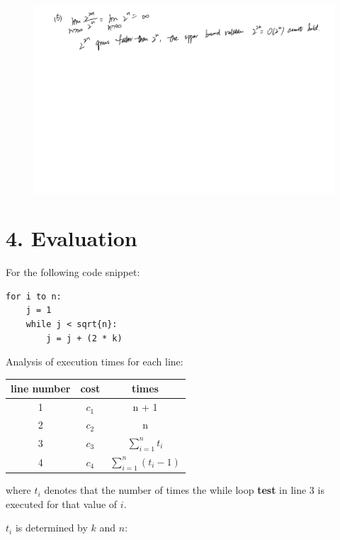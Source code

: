 \documentclass[10pt]{article}
\begin{document}
\begin{figure}[H]
  \centering
  \includegraphics[width=\linewidth]{../assets/3_4.jpg}
\end{figure}

\section*{4. Evaluation}

For the following code snippet:

\begin{lstlisting}
for i to n:
    j = 1
    while j < sqrt{n}:
        j = j + (2 * k)
\end{lstlisting}

Analysis of execution times for each line:

\begin{center}
  \begin{tabular}{||c c c||}
    \hline
    line number & cost  & times                    \\
    \hline
    1           & $c_1$ & n + 1                    \\
    \hline
    2           & $c_2$ & n                        \\
    \hline
    3           & $c_3$ & $\sum_{i=1}^n t_i$       \\
    \hline
    4           & $c_4$ & $\sum_{i=1}^n (t_i - 1)$ \\
    \hline
  \end{tabular}
\end{center}

where $t_i$ denotes that the number of times the while loop {\bf test} in line 3 is executed for that value of $i$.

$t_i$ is determined by $k$ and $n$:
\end{document}
